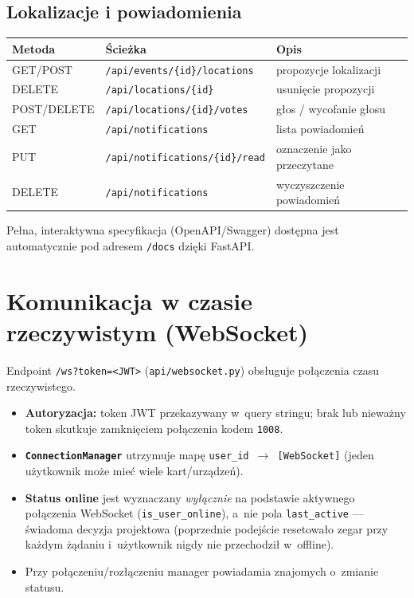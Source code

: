 \documentclass[11pt,a4paper]{article}
\begin{document}
\subsection{Lokalizacje i powiadomienia}
\begin{longtable}{L{1.8cm} L{6cm} L{5cm}}
\toprule
\textbf{Metoda} & \textbf{Ścieżka} & \textbf{Opis} \\
\midrule
\endhead
GET/POST & \texttt{/api/events/\{id\}/locations} & propozycje lokalizacji \\
DELETE & \texttt{/api/locations/\{id\}} & usunięcie propozycji \\
POST/DELETE & \texttt{/api/locations/\{id\}/votes} & głos / wycofanie głosu \\
GET & \texttt{/api/notifications} & lista powiadomień \\
PUT & \texttt{/api/notifications/\{id\}/read} & oznaczenie jako przeczytane \\
DELETE & \texttt{/api/notifications} & wyczyszczenie powiadomień \\
\bottomrule
\end{longtable}

\noindent Pełna, interaktywna specyfikacja (OpenAPI/Swagger) dostępna jest automatycznie
pod adresem \texttt{/docs} dzięki FastAPI.

\section{Komunikacja w czasie rzeczywistym (WebSocket)}

Endpoint \texttt{/ws?token=<JWT>} (\texttt{api/websocket.py}) obsługuje połączenia czasu
rzeczywistego.

\begin{itemize}[noitemsep]
    \item \textbf{Autoryzacja:} token JWT przekazywany w~query stringu; brak lub nieważny
          token skutkuje zamknięciem połączenia kodem \texttt{1008}.
    \item \textbf{\texttt{ConnectionManager}} utrzymuje mapę
          \texttt{user\_id $\rightarrow$ [WebSocket]} (jeden użytkownik może mieć wiele
          kart/urządzeń).
    \item \textbf{Status online} jest wyznaczany \emph{wyłącznie} na podstawie aktywnego
          połączenia WebSocket (\texttt{is\_user\_online}), a~nie pola \texttt{last\_active}
          --- świadoma decyzja projektowa (poprzednie podejście resetowało zegar przy każdym
          żądaniu i~użytkownik nigdy nie przechodził w~offline).
    \item Przy połączeniu/rozłączeniu manager powiadamia znajomych o~zmianie statusu.
\end{itemize}
\end{document}

